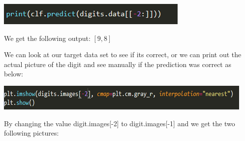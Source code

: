 \documentclass[a4paper,12pt]{report}
\begin{document}
\begin{center}
    \captionsetup{type=figure}
    \includegraphics[width=.5\linewidth]{media/CLFpredict.png}
\end{center}

We get the following output: $[9, 8]$

We can look at our target data set to see if its correct, or we can print out the actual picture of the digit and see manually if the prediction was correct as below:

\begin{center}
    \captionsetup{type=figure}
    \includegraphics[width=.9\linewidth]{media/pltImShow.png}
\end{center}

By changing the value digit.images[-2] to digit.images[-1] and we get the two following pictures:
\end{document}
